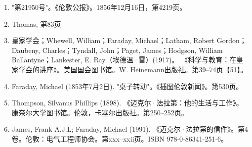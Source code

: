 \begin{enumerate}
\item "第21950号"。《伦敦公报》。1856年12月16日，第4219页。
\item Thomas, 第83页
\item 皇家学会；Whewell, William；Faraday, Michael；Latham, Robert Gordon；Daubeny, Charles；Tyndall, John；Paget, James；Hodgson, William Ballantyne；Lankester, E. Ray（埃德温·雷）(1917)。 《科学与教育：在皇家学会的讲座》。美国国会图书馆。W. Heinemann出版社。第39–74页【51】。
\item Faraday, Michael (1853年7月2日). "桌子转动"。《插图伦敦新闻》。第530页。
\item Thompson, Silvanus Phillips (1898). 《迈克尔·法拉第：他的生活与工作》。康奈尔大学图书馆。伦敦，卡塞尔出版社。第250–252页。
\item James, Frank A.J.L; Faraday, Michael (1991). 《迈克尔·法拉第的信件》。第4卷。伦敦：电气工程师协会。第xxx–xxii页。ISBN 978-0-86341-251-6。


\end{enumerate}